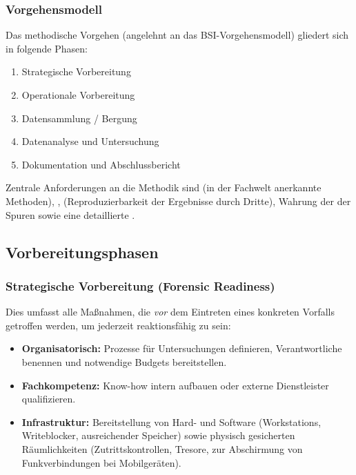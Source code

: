 \documentclass[
../../css_summary.tex,
]{subfiles}
\begin{document}
\subsubsection{Vorgehensmodell}
Das methodische Vorgehen (angelehnt an das BSI-Vorgehensmodell) gliedert sich in folgende Phasen:
\begin{enumerate}
  \item Strategische Vorbereitung
  \item Operationale Vorbereitung
  \item Datensammlung / Bergung
  \item Datenanalyse und Untersuchung
  \item Dokumentation und Abschlussbericht
\end{enumerate}

Zentrale Anforderungen an die Methodik sind  (in der Fachwelt anerkannte Methoden), ,  (Reproduzierbarkeit der Ergebnisse durch Dritte), Wahrung der  der Spuren sowie eine detaillierte .

\subsection{Vorbereitungsphasen}

\subsubsection{Strategische Vorbereitung (Forensic Readiness)}
Dies umfasst alle Maßnahmen, die \textit{vor} dem Eintreten eines konkreten Vorfalls getroffen werden, um jederzeit reaktionsfähig zu sein:
\begin{itemize}
  \item \textbf{Organisatorisch:} Prozesse für Untersuchungen definieren, Verantwortliche benennen und notwendige Budgets bereitstellen.
  \item \textbf{Fachkompetenz:} Know-how intern aufbauen oder externe Dienstleister qualifizieren.
  \item \textbf{Infrastruktur:} Bereitstellung von Hard- und Software (Workstations, Writeblocker, ausreichender Speicher) sowie physisch gesicherten Räumlichkeiten (Zutrittskontrollen, Tresore,  zur Abschirmung von Funkverbindungen bei Mobilgeräten).
\end{itemize}
\end{document}
